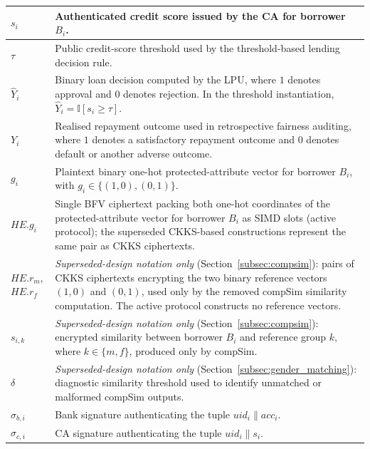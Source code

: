 \documentclass[a4paper,fleqn]{cas-dc}
\begin{document}
\begin{table}[htbp]
\begin{tabular}{|p{2.6cm}|p{11.4cm}|}
$s_i$
& Authenticated credit score issued by the CA for borrower $B_i$. \\
\hline

$\tau$
& Public credit-score threshold used by the threshold-based lending decision rule. \\
\hline

$\widehat{Y}_i$
& Binary loan decision computed by the LPU, where $1$ denotes approval and $0$
denotes rejection. In the threshold instantiation,
$\widehat{Y}_i=\mathbb{I}[s_i\geq\tau]$. \\
\hline

$Y_i$
& Realised repayment outcome used in retrospective fairness auditing, where $1$ denotes a satisfactory repayment outcome and $0$ denotes default or another adverse outcome. \\
\hline

$g_i$
& Plaintext binary one-hot protected-attribute vector for borrower $B_i$, with $g_i\in\{(1,0),(0,1)\}$. \\
\hline

$HE.g_i$ & Single BFV ciphertext packing both one-hot coordinates of the protected-attribute vector for borrower $B_i$ as SIMD slots (active protocol); the superseded CKKS-based constructions represent the same pair as CKKS ciphertexts. \\ \hline

$HE.r_m$, $HE.r_f$ & \emph{Superseded-design notation only} (Section~\ref{subsec:compsim}): pairs of CKKS ciphertexts encrypting the two binary reference vectors $(1,0)$ and $(0,1)$, used only by the removed \textsf{compSim} similarity computation. The active protocol constructs no reference vectors. \\ \hline

$s_{i,k}$
& \emph{Superseded-design notation only} (Section~\ref{subsec:compsim}): encrypted similarity between borrower $B_i$ and reference group $k$, where $k\in\{m,f\}$, produced only by \textsf{compSim}. \\
\hline

$\delta$
& \emph{Superseded-design notation only} (Section~\ref{subsec:gender_matching}): diagnostic similarity threshold used to identify unmatched or malformed \textsf{compSim} outputs. \\
\hline

$\sigma_{b,i}$
& Bank signature authenticating the tuple $uid_i\parallel acc_i$. \\
\hline

$\sigma_{c,i}$
& CA signature authenticating the tuple $uid_i\parallel s_i$. \\
\hline


\end{tabular}
\end{table}
\end{document}
